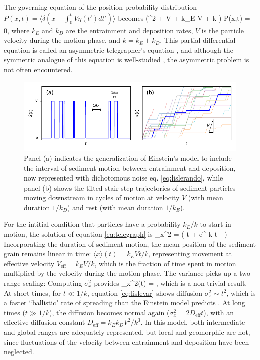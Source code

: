 The governing equation of the position probability distribution $P(x,t) = \langle \delta(x-\int_0^t V\eta(t')dt') \rangle$ becomes \citep{Balakrishnan1993}
\be \big(\pt^2 + V \px \pt + k_E V \px + k \pt \big) P(x,t) = 0,\ee
where $k_E$ and $k_D$ are the entrainment and deposition rates, $V$ is the particle velocity during the motion phase, and $k = k_E+k_D$. This partial differential equation is called an asymmetric telegrapher's equation \citep{Rossetto2018}, and although the symmetric analogue of this equation is well-studied \citep{Weiss2002a, Masoliver2017}, the asymmetric problem is not often encountered.
\begin{figure}[!htbp]
	\includegraphics[width=\linewidth,keepaspectratio]{./figures/ch1/lisleConcept.pdf}
	\caption{Panel (a) indicates the generalization of Einstein's model to include the interval of sediment motion between entrainment and deposition, now represented with dichotomous noise eq. \ref{eq:lislerando}, while panel (b) shows the tilted stair-step trajectories of sediment particles moving downstream in cycles of motion at velocity $V$ (with mean duration $1/k_D$) and rest (with mean duration $1/k_E$). }
	\label{fig:lislefig}
\end{figure}

For the intitial condition that particles have a probability $k_E/k$ to start in motion, the solution of equation \ref{eq:telegraph} is \citep{Lisle1998}
\be  \sigma_x^2 = \Big( t + e^{-k t} - \Big) \ee
Incorporating the duration of sediment motion, the mean position of the sediment grain remains linear in time: $\langle x \rangle (t) = k_E V t/k$, representing movement at effective velocity $V_\text{eff} = k_E V/k$, which is the fraction of time spent in motion multiplied by the velocity during the motion phase. The variance picks up a two range scaling:
Computing $\sigma_x^2$ provides
\be \sigma_x^2(t) = ,\ee
which is a non-trivial result. At short times, for $t\ll 1/k$, equation \ref{eq:lislevar} shows diffusion $\sigma_x^2 \sim t^2$, which is a faster ``ballistic" rate of spreading than the Einstein model predicts \citep{Sokolov2012}. At long times ($t\gg 1/k$), the diffusion becomes normal again ($\sigma_x^2 = 2 D_\text{eff} t$), with an effective diffusion constant $ D_\text{eff} = k_E k_D V^2/k^3$.
In this model, both intermediate and global ranges are adequately represented, but local and geomorphic are not, since fluctuations of the velocity between entrainment and deposition have been neglected.

